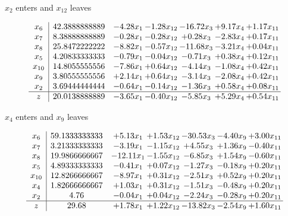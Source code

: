 \documentclass[8pt]{article}
\begin{document}
 $ x_{2} $ enters and $ x_{12} $ leaves 

 \[\begin{array}{c| c c@{\hskip 2pt} c@{\hskip 2pt} c@{\hskip 2pt} c@{\hskip 2pt} c@{\hskip 2pt} }
 x_{6}   &  42.3888888889 & -4.28 x_{1} & -1.28 x_{12} & -16.72 x_{3} & +  9.17 x_{4} & +  1.17 x_{11}\\
 x_{7}   &  8.38888888889 & -0.28 x_{1} & -0.28 x_{12} & +  0.28 x_{3} & -2.83 x_{4} & +  0.17 x_{11}\\
 x_{8}   &  25.8472222222 & -8.82 x_{1} & -0.57 x_{12} & -11.68 x_{3} & -3.21 x_{4} & +  0.04 x_{11}\\
 x_{5}   &  4.20833333333 & -0.79 x_{1} & -0.04 x_{12} & -0.71 x_{3} & +  0.38 x_{4} & +  0.12 x_{11}\\
 x_{10}   &  14.8055555556 & -7.86 x_{1} & +  0.64 x_{12} & -4.14 x_{3} & -1.08 x_{4} & +  0.42 x_{11}\\
 x_{9}   &  3.80555555556 & +  2.14 x_{1} & +  0.64 x_{12} & -3.14 x_{3} & -2.08 x_{4} & +  0.42 x_{11}\\
 x_{2}   &  3.69444444444 & -0.64 x_{1} & -0.14 x_{12} & -1.36 x_{3} & +  0.58 x_{4} & +  0.08 x_{11}\\
\hline
z    &  20.0138888889 & -3.65 x_{1} & -0.40 x_{12} & -5.85 x_{3} & +  5.29 x_{4} & +  0.54 x_{11}\\
\end{array}\]


 $ x_{4} $ enters and $ x_{9} $ leaves 

 \[\begin{array}{c| c c@{\hskip 2pt} c@{\hskip 2pt} c@{\hskip 2pt} c@{\hskip 2pt} c@{\hskip 2pt} }
 x_{6}   &  59.1333333333 & +  5.13 x_{1} & +  1.53 x_{12} & -30.53 x_{3} & -4.40 x_{9} & +  3.00 x_{11}\\
 x_{7}   &  3.21333333333 & -3.19 x_{1} & -1.15 x_{12} & +  4.55 x_{3} & +  1.36 x_{9} & -0.40 x_{11}\\
 x_{8}   &  19.9866666667 & -12.11 x_{1} & -1.55 x_{12} & -6.85 x_{3} & +  1.54 x_{9} & -0.60 x_{11}\\
 x_{5}   &  4.89333333333 & -0.41 x_{1} & +  0.07 x_{12} & -1.27 x_{3} & -0.18 x_{9} & +  0.20 x_{11}\\
 x_{10}   &  12.8266666667 & -8.97 x_{1} & +  0.31 x_{12} & -2.51 x_{3} & +  0.52 x_{9} & +  0.20 x_{11}\\
 x_{4}   &  1.82666666667 & +  1.03 x_{1} & +  0.31 x_{12} & -1.51 x_{3} & -0.48 x_{9} & +  0.20 x_{11}\\
 x_{2}   &  4.76 & -0.04 x_{1} & +  0.04 x_{12} & -2.24 x_{3} & -0.28 x_{9} & +  0.20 x_{11}\\
\hline
z    &  29.68 & +  1.78 x_{1} & +  1.22 x_{12} & -13.82 x_{3} & -2.54 x_{9} & +  1.60 x_{11}\\
\end{array}\]
\end{document}
